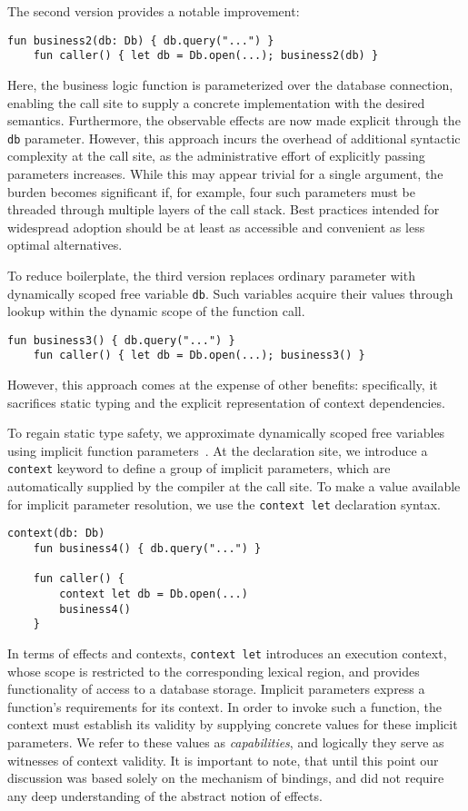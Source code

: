 \documentclass[acmsmall,review,screen]{acmart}
\begin{document}
The second version provides a notable improvement:
\begin{lstlisting}[language=colang]
    fun business2(db: Db) { db.query("...") }
    fun caller() { let db = Db.open(...); business2(db) }
\end{lstlisting}
Here, the business logic function is parameterized over the database connection, enabling the call site to supply a concrete implementation with the desired semantics.
Furthermore, the observable effects are now made explicit through the \texttt{db} parameter.
However, this approach incurs the overhead of additional syntactic complexity at the call site, as the administrative effort of explicitly passing parameters increases.
While this may appear trivial for a single argument, the burden becomes significant if, for example, four such parameters must be threaded through multiple layers of the call stack.
Best practices intended for widespread adoption should be at least as accessible and convenient as less optimal alternatives.

To reduce boilerplate, the third version replaces ordinary parameter with dynamically scoped free variable \lstinline[language=colang]{db}.
Such variables acquire their values through lookup within the dynamic scope of the function call.
\begin{lstlisting}[language=colang]
    fun business3() { db.query("...") }
    fun caller() { let db = Db.open(...); business3() }
\end{lstlisting}
However, this approach comes at the expense of other benefits: specifically, it sacrifices static typing and the explicit representation of context dependencies.

To regain static type safety, we approximate dynamically scoped free variables using implicit function parameters~\cite{lewis2000implicit}.
At the declaration site, we introduce a \lstinline[language=colang]|context| keyword to define a group of implicit parameters, which are automatically supplied by the compiler at the call site.
To make a value available for implicit parameter resolution, we use the \lstinline[language=colang]{context let} declaration syntax.
\begin{lstlisting}[language=colang]
    context(db: Db)
    fun business4() { db.query("...") }

    fun caller() {
        context let db = Db.open(...)
        business4()
    }
\end{lstlisting}

In terms of effects and contexts, \lstinline[language=colang]|context let| introduces an execution context, whose scope is restricted to the corresponding lexical region, and provides functionality of access to a database storage.
Implicit parameters express a function's requirements for its context.
In order to invoke such a function, the context must establish its validity by supplying concrete values for these implicit parameters.
We refer to these values as \textit{capabilities}, and logically they serve as witnesses of context validity.
It is important to note, that until this point our discussion was based solely on the mechanism of bindings, and did not require any deep understanding of the abstract notion of effects.
\end{document}
